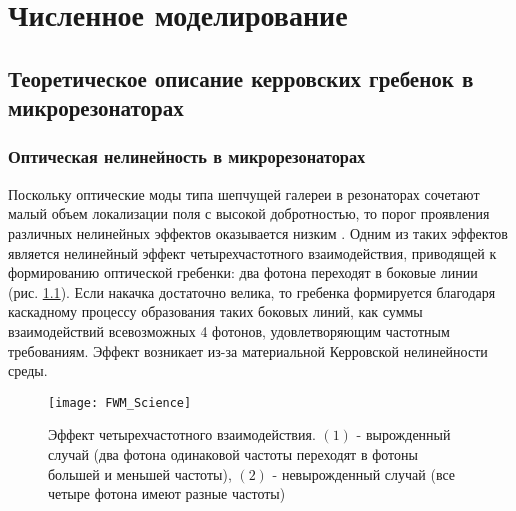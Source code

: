\chapter{Численное моделирование} \label{chapt2}

\section{Теоретическое описание керровских гребенок в микрорезонаторах}

\subsection{Оптическая нелинейность в микрорезонаторах}
Поскольку оптические моды типа шепчущей галереи в резонаторах сочетают малый объем локализации поля с высокой добротностью, то порог проявления различных нелинейных эффектов оказывается низким \cite{Gorodetsky}. Одним из таких эффектов является нелинейный эффект четырехчастотного взаимодействия, приводящей к формированию оптической гребенки: два фотона переходят в боковые линии (рис. \ref{cascading}). Если накачка достаточно велика, то гребенка формируется благодаря каскадному процессу образования таких боковых линий, как суммы взаимодействий всевозможных 4 фотонов, удовлетворяющим частотным требованиям. Эффект возникает из-за материальной Керровской нелинейности среды.

\begin{figure}
  \centering
  \texttt{[image: FWM\_Science]}
  \caption{Эффект четырехчастотного взаимодействия. $(1)$ - вырожденный случай (два фотона одинаковой частоты переходят в фотоны большей и меньшей частоты), $(2)$ - невырожденный случай (все четыре фотона имеют разные частоты)} \label{cascading}
\end{figure}


